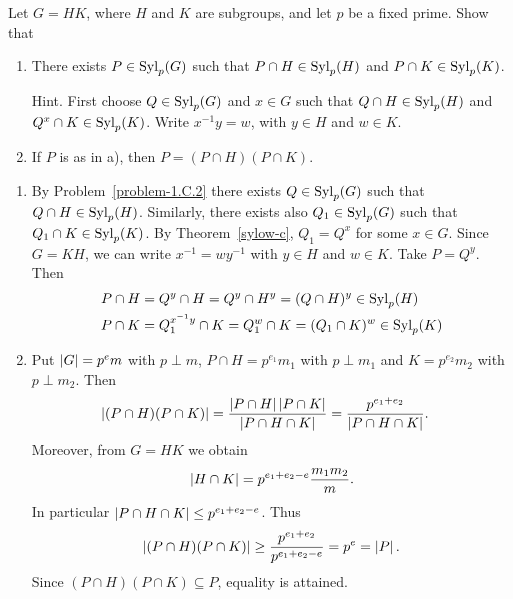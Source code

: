 \begin{probl}
    Let $G = HK$, where $H$ and $K$ are subgroups, and let $p$ be a fixed prime. Show that
    \begin{enumerate}[\upshape a)]
        \item There exists $P\in{\rm Syl}_p(G)$ such that $P\cap H\in{\rm Syl}_p(H)$ and $P\cap K\in{\rm Syl}_p(K)$.
        
        \textrm{\upshape Hint. First choose $Q\in{\rm Syl}_p(G)$ and $x\in G$ such that $Q\cap H\in{\rm Syl}_p(H)$ and $Q^x\cap K\in{\rm Syl}_p(K)$. Write $x^{-1}y=w$, with $y\in H$ and $w\in K$.}

        \item If $P$ is as in\/ {\upshape a)}, then $P=(P\cap H)(P\cap K)$.
    \end{enumerate}
\end{probl}

\begin{solution}

\begin{enumerate}[\upshape a)]
    \item By Problem~\ref{problem-1.C.2} there exists $Q\in{\rm Syl}_p(G)$ such that $Q\cap H\in{\rm Syl}_p(H)$. Similarly, there exists also $Q_1\in{\rm Syl}_p(G)$ such that $Q_1\cap K\in{\rm Syl}_p(K)$. By Theorem~\ref{sylow-c}, $Q_1=Q^x$ for some $x\in G$. Since $G=KH$, we can write $x^{-1}=wy^{-1}$ with $y\in H$ and $w\in K$. Take $P=Q^y$. Then
    \begin{align*}
        P\cap H &= Q^y\cap H = Q^y\cap H^y = (Q\cap H)^y\in{\rm Syl}_p(H)\\
        P\cap K &= Q_1^{x^{-1}y}\cap K = Q_1^w\cap K = (Q_1\cap K)^w\in{\rm Syl}_p(K)\\        
    \end{align*}

    \item Put $\left\vert{G}\right\vert=p^em$ with $p\perp m$, $P\cap H=p^{e_1}m_1$ with $p\perp m_1$ and $K=p^{e_2}m_2$ with $p\perp m_2$. Then
    \begin{align*}
        \left\vert{(P\cap H)(P\cap K)}\right\vert &= \frac{\left\vert{P\cap H}\right\vert\left\vert{P\cap K}\right\vert}
                {\left\vert{P\cap H\cap K}\right\vert}
            = \frac{p^{e_1+e_2}}{\left\vert{P\cap H\cap K}\right\vert}.
    \end{align*}
    Moreover, from $G=HK$ we obtain
    $$
        \left\vert{H\cap K}\right\vert = p^{e_1+e_2-e}\frac{m_1m_2}{m}.
    $$
    In particular $\left\vert{P\cap H\cap K}\right\vert\le p^{e_1+e_2-e}$. Thus
    $$
        \left\vert{(P\cap H)(P\cap K)}\right\vert \ge \frac{p^{e_1+e_2}}{p^{e_1+e_2-e}}=p^e=\left\vert{P}\right\vert.
    $$
    Since $(P\cap H)(P\cap K)\subseteq P$, equality is attained.
\end{enumerate}
\end{solution}



